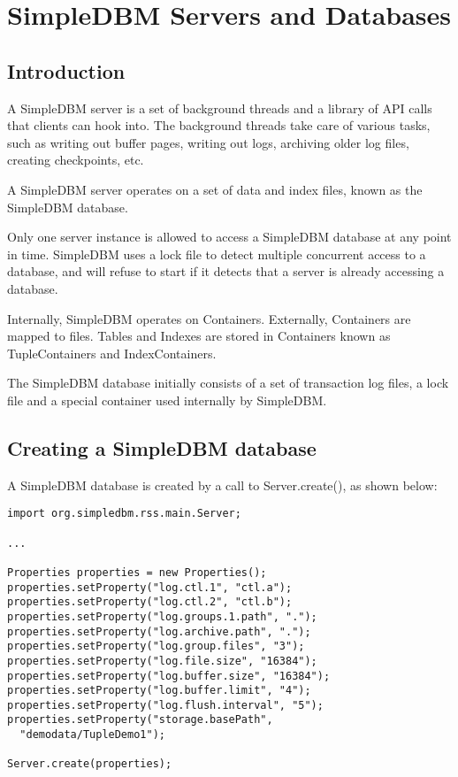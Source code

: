 \documentclass[a4paper,draft,oneside]{book}
\begin{document}
\chapter{SimpleDBM Servers and Databases}

\section{Introduction}

A SimpleDBM server is a set of background threads and a library of API
calls that clients can hook into. The background threads take care of
various tasks, such as writing out buffer pages, writing out logs,
archiving older log files, creating checkpoints, etc.

A SimpleDBM server operates on a set of data and index files, known as
the SimpleDBM database.

Only one server instance is allowed to access a SimpleDBM database at
any point in time. SimpleDBM uses a lock file to detect multiple
concurrent access to a database, and will refuse to start if it
detects that a server is already accessing a database.

Internally, SimpleDBM operates on Containers. Externally, Containers
are mapped to files. Tables and Indexes are stored in Containers known
as TupleContainers and IndexContainers.

The SimpleDBM database initially consists of a set of transaction log
files, a lock file and a special container used internally by
SimpleDBM.

\section{Creating a SimpleDBM database}

A SimpleDBM database is created by a call to Server.create(), as shown
below:

\begin{verbatim}
import org.simpledbm.rss.main.Server;

...

Properties properties = new Properties();
properties.setProperty("log.ctl.1", "ctl.a");
properties.setProperty("log.ctl.2", "ctl.b");
properties.setProperty("log.groups.1.path", ".");
properties.setProperty("log.archive.path", ".");
properties.setProperty("log.group.files", "3");
properties.setProperty("log.file.size", "16384");
properties.setProperty("log.buffer.size", "16384");
properties.setProperty("log.buffer.limit", "4");
properties.setProperty("log.flush.interval", "5");
properties.setProperty("storage.basePath", 
  "demodata/TupleDemo1");

Server.create(properties);
\end{verbatim}
\end{document}
